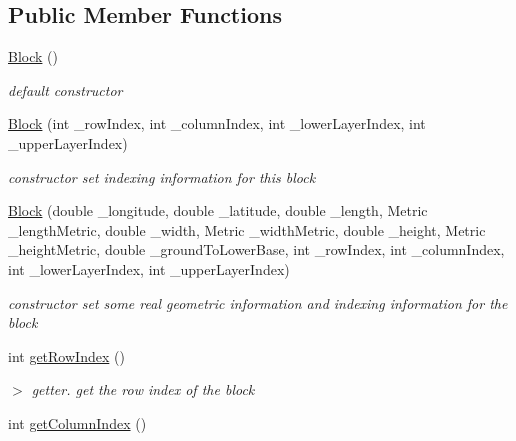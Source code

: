 \subsection*{\-Public \-Member \-Functions}
\begin{DoxyCompactItemize}
\item 
\hypertarget{classBlock_a37658a946bf5067ad01d68d9ff086adc}{\hyperlink{classBlock_a37658a946bf5067ad01d68d9ff086adc}{\-Block} ()}\label{classBlock_a37658a946bf5067ad01d68d9ff086adc}

\begin{DoxyCompactList}\small\item\em default constructor \end{DoxyCompactList}\item 
\hypertarget{classBlock_a9be88ea094e64d4e8cf293554fba92f6}{\hyperlink{classBlock_a9be88ea094e64d4e8cf293554fba92f6}{\-Block} (int \-\_\-row\-Index, int \-\_\-column\-Index, int \-\_\-lower\-Layer\-Index, int \-\_\-upper\-Layer\-Index)}\label{classBlock_a9be88ea094e64d4e8cf293554fba92f6}

\begin{DoxyCompactList}\small\item\em constructor set indexing information for this block \end{DoxyCompactList}\item 
\hypertarget{classBlock_a225498988afa0931232800e67905c57e}{\hyperlink{classBlock_a225498988afa0931232800e67905c57e}{\-Block} (double \-\_\-longitude, double \-\_\-latitude, double \-\_\-length, \-Metric \-\_\-length\-Metric, double \-\_\-width, \-Metric \-\_\-width\-Metric, double \-\_\-height, \-Metric \-\_\-height\-Metric, double \-\_\-ground\-To\-Lower\-Base, int \-\_\-row\-Index, int \-\_\-column\-Index, int \-\_\-lower\-Layer\-Index, int \-\_\-upper\-Layer\-Index)}\label{classBlock_a225498988afa0931232800e67905c57e}

\begin{DoxyCompactList}\small\item\em constructor set some real geometric information and indexing information for the block \end{DoxyCompactList}\item 
\hypertarget{classBlock_aa89686c705375aae3dc8d8adb7cd9b0b}{int \hyperlink{classBlock_aa89686c705375aae3dc8d8adb7cd9b0b}{get\-Row\-Index} ()}\label{classBlock_aa89686c705375aae3dc8d8adb7cd9b0b}

\begin{DoxyCompactList}\small\item\em $>$ getter. get the row index of the block \end{DoxyCompactList}\item 
\hypertarget{classBlock_ac210bace38ac9f0396ad98ebdce28819}{int \hyperlink{classBlock_ac210bace38ac9f0396ad98ebdce28819}{get\-Column\-Index} ()}\label{classBlock_ac210bace38ac9f0396ad98ebdce28819}


\end{DoxyCompactItemize}
